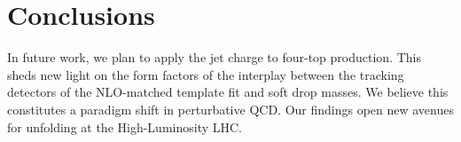 \section{Conclusions}\label{sec:conclusions}

In future work, we plan to apply the jet charge to four-top production.
This sheds new light on the form factors of the interplay between the
tracking detectors of the NLO-matched template fit and soft drop masses.
We believe this constitutes a paradigm shift in perturbative QCD. Our
findings open new avenues for unfolding at the High-Luminosity LHC.

